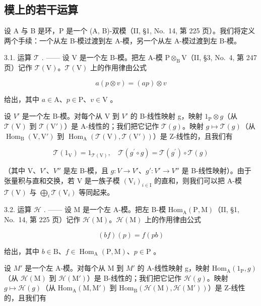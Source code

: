 \subsection{模上的若干运算}

设 A 与 B 是环，P 是一个 (A, B)-双模（II, §1, No.~14, 第 225 页）。我们将定义两个手续：一个从左 B-模过渡到左 A-模，另一个从左 A-模过渡到左 B-模。

3.1. 运算 \(\mathcal{T}\) . —— 设 V 是一个左 B-模。把左 A-模 \(\mathrm{P} \otimes_{\mathrm{B}} \mathrm{V}\)（II, §3, No.~4, 第 247 页）记作 \(\mathcal{T}(\mathrm{V})\)。\(\mathcal{T}(\mathrm{V})\) 上的作用律由公式

\[
a (p \otimes v) = (a p) \otimes v\tag{1}
\]

给出，其中 \(a \in \mathrm{A}\)、\(p \in \mathrm{P}\)、\(v \in \mathrm{V}\) 。

设 \(V'\) 是一个左 B-模。对每个从 V 到 \(V'\) 的 B-线性映射 g，映射 \(1_{\mathrm{P}} \otimes g\)（从 \(\mathcal{T}(\mathrm{V})\) 到 \(\mathcal{T}(\mathrm{V}')\)）是 A-线性的；我们把它记作 \(\mathcal{T}(g)\)。映射 \(g \mapsto \mathcal{T}(g)\)（从 \(\operatorname{Hom}_{\mathrm{B}}(\mathrm{V}, \mathrm{V}')\) 到 \(\operatorname{Hom}_{\mathrm{A}}(\mathcal{T}(\mathrm{V}), \mathcal{T}(\mathrm{V}'))\)）是 Z-线性的，且我们有

\[
\mathcal {T} (1 _ {\mathrm{V}}) = 1 _ {\mathcal {T} (\mathrm{V})}, \quad \mathcal {T} (g ^ {\prime} \circ g) = \mathcal {T} (g ^ {\prime}) \circ \mathcal {T} (g)\tag{2}
\]

（其中 V、\(V'\)、\(V''\) 是左 B-模，且 \(g : V \to V'\)、\(g' : V' \to V''\) 是 B-线性映射）。由于张量积与直和交换，若 V 是一族子模 \((\mathrm{V}_{i})_{i \in \mathrm{I}}\) 的直和，则我们可以把 A-模 \(\mathcal{T}(\mathrm{V})\) 与 \(\bigoplus_{i} \mathcal{T}(\mathrm{V}_{i})\) 等同起来。

3.2. 运算 \(\mathcal{H}\) . —— 设 M 是一个左 A-模。把左 B-模 \(\mathrm{Hom}_{\mathrm{A}}(\mathrm{P},\mathrm{M})\)（II, §1, No.~14, 第 225 页）记作 \(\mathcal{H}(\mathrm{M})\)。\(\mathcal{H}(\mathrm{M})\) 上的作用律由公式

\[
(b f) (p) = f (p b)\tag{3}
\]

给出，其中 \(b \in \mathrm{B}\)、\(f \in \operatorname{Hom}_{\mathrm{A}}(\mathrm{P}, \mathrm{M})\)、\(p \in \mathrm{P}\) 。

设 \(M'\) 是一个左 A-模。对每个从 M 到 \(M'\) 的 A-线性映射 g，映射 \(\mathrm{Hom}_{\mathrm{A}}(1_{\mathrm{P}}, g)\)（从 \(\mathcal{H}(\mathrm{M})\) 到 \(\mathcal{H}(\mathrm{M}')\)）是 B-线性的；我们把它记作 \(\mathcal{H}(g)\)。映射 \(g \mapsto \mathcal{H}(g)\)（从 \(\mathrm{Hom}_{\mathrm{A}}(\mathrm{M}, \mathrm{M}')\) 到 \(\mathrm{Hom}_{\mathrm{B}}(\mathcal{H}(\mathrm{M}), \mathcal{H}(\mathrm{M}'))\)）是 Z-线性的，且我们有

